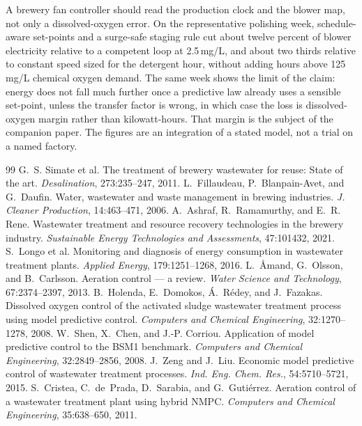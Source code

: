 \documentclass[11pt,a4paper]{article}
\begin{document}
A brewery fan controller should read the production clock and the blower map, not only a dissolved-oxygen error. On the representative polishing week, schedule-aware set-points and a surge-safe staging rule cut about twelve percent of blower electricity relative to a competent loop at 2.5\,mg/L, and about two thirds relative to constant speed sized for the detergent hour, without adding hours above 125\,mg/L chemical oxygen demand. The same week shows the limit of the claim: energy does not fall much further once a predictive law already uses a sensible set-point, unless the transfer factor is wrong, in which case the loss is dissolved-oxygen margin rather than kilowatt-hours. That margin is the subject of the companion paper. The figures are an integration of a stated model, not a trial on a named factory.

\begin{thebibliography}{99}
 G.~S. Simate et al. The treatment of brewery wastewater for reuse: State of the art. \textit{Desalination}, 273:235--247, 2011.
 L.~Fillaudeau, P.~Blanpain-Avet, and G.~Daufin. Water, wastewater and waste management in brewing industries. \textit{J. Cleaner Production}, 14:463--471, 2006.
 A.~Ashraf, R.~Ramamurthy, and E.~R. Rene. Wastewater treatment and resource recovery technologies in the brewery industry. \textit{Sustainable Energy Technologies and Assessments}, 47:101432, 2021.
 S.~Longo et al. Monitoring and diagnosis of energy consumption in wastewater treatment plants. \textit{Applied Energy}, 179:1251--1268, 2016.
 L.~{\AA}mand, G.~Olsson, and B.~Carlsson. Aeration control --- a review. \textit{Water Science and Technology}, 67:2374--2397, 2013.
 B.~Holenda, E.~Domokos, {\'A}.~R{\'e}dey, and J.~Fazakas. Dissolved oxygen control of the activated sludge wastewater treatment process using model predictive control. \textit{Computers and Chemical Engineering}, 32:1270--1278, 2008.
 W.~Shen, X.~Chen, and J.-P. Corriou. Application of model predictive control to the BSM1 benchmark. \textit{Computers and Chemical Engineering}, 32:2849--2856, 2008.
 J.~Zeng and J.~Liu. Economic model predictive control of wastewater treatment processes. \textit{Ind. Eng. Chem. Res.}, 54:5710--5721, 2015.
 S.~Cristea, C.~de~Prada, D.~Sarabia, and G.~Guti{\'e}rrez. Aeration control of a wastewater treatment plant using hybrid NMPC. \textit{Computers and Chemical Engineering}, 35:638--650, 2011.

\end{thebibliography}
\end{document}
